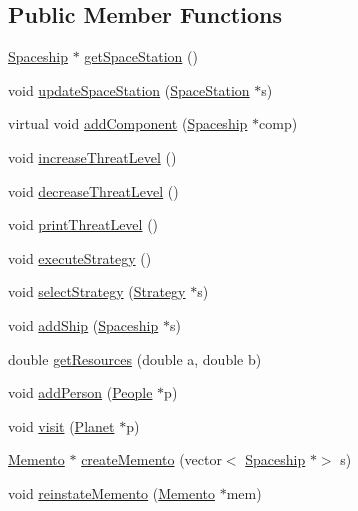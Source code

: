 \subsection*{Public Member Functions}
\begin{DoxyCompactItemize}
\item 
\hyperlink{classSpaceship}{Spaceship} $\ast$ \hyperlink{classSpaceStation_acffc1d332b904f06b55288819e69f3c8}{get\+Space\+Station} ()
\item 
void \hyperlink{classSpaceStation_ab48ad7ea32bba4facb732bc988b96ca3}{update\+Space\+Station} (\hyperlink{classSpaceStation}{Space\+Station} $\ast$s)
\item 
virtual void \hyperlink{classSpaceStation_ae89449fdcf5d44229fb93a14fc496fe1}{add\+Component} (\hyperlink{classSpaceship}{Spaceship} $\ast$comp)
\item 
void \hyperlink{classSpaceStation_aa9390e8af0d69fc176c190f8f6891736}{increase\+Threat\+Level} ()
\item 
void \hyperlink{classSpaceStation_a0cb67593dc02495793635adb66f595e9}{decrease\+Threat\+Level} ()
\item 
void \hyperlink{classSpaceStation_a430ee680ac20af8245640e9271095688}{print\+Threat\+Level} ()
\item 
void \hyperlink{classSpaceStation_a4a3c46e04527ecb72d19a1187dcfd31a}{execute\+Strategy} ()
\item 
void \hyperlink{classSpaceStation_adddfe90b720e2b0a8ce5d27a20eb204e}{select\+Strategy} (\hyperlink{classStrategy}{Strategy} $\ast$s)
\item 
void \hyperlink{classSpaceStation_ace2d37733fa5af9551aba31bc9229ad3}{add\+Ship} (\hyperlink{classSpaceship}{Spaceship} $\ast$s)
\item 
double \hyperlink{classSpaceStation_ae701844b2b5013cd51cc5ead813e7e51}{get\+Resources} (double a, double b)
\item 
void \hyperlink{classSpaceStation_a46146c02fcd8107eda2972cc5843afd8}{add\+Person} (\hyperlink{classPeople}{People} $\ast$p)
\item 
void \hyperlink{classSpaceStation_a22638e4ee44a667bd59b8795c9444b84}{visit} (\hyperlink{classPlanet}{Planet} $\ast$p)
\item 
\hyperlink{classMemento}{Memento} $\ast$ \hyperlink{classSpaceStation_a7396c4080f29ca9c20975f831008b011}{create\+Memento} (vector$<$ \hyperlink{classSpaceship}{Spaceship} $\ast$$>$ s)
\item 
void \hyperlink{classSpaceStation_a4d39ac0fe8f0aa521c32011f1a1bad9b}{reinstate\+Memento} (\hyperlink{classMemento}{Memento} $\ast$mem)
\end{DoxyCompactItemize}
